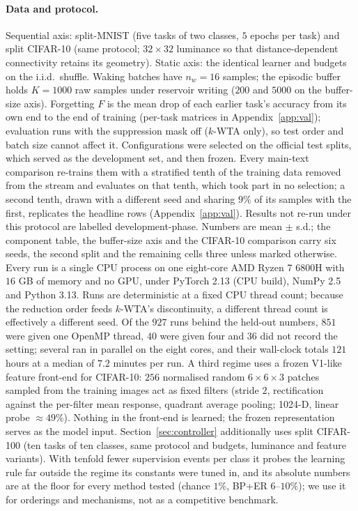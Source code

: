 \documentclass{article}
\newcommand{\kwta}{$k$-WTA}
\begin{document}
\paragraph{Data and protocol.}
Sequential axis: split-MNIST (five tasks of two classes, $5$ epochs per task) and split CIFAR-10
(same protocol; $32{\times}32$ luminance so that distance-dependent connectivity retains its
geometry). Static axis: the identical learner and budgets on the i.i.d.\ shuffle. Waking batches
have $n_w=16$ samples; the episodic buffer holds $K{=}1000$ raw samples under reservoir
writing ($200$ and $5000$ on the buffer-size axis). Forgetting $F$ is the mean drop of each
earlier task's accuracy from its own end to
the end of training (per-task matrices in Appendix~\ref{app:val}); evaluation runs with the
suppression mask off (\kwta{} only), so test order and batch size cannot affect it.
Configurations were selected on the official test splits, which served as the development
set, and then frozen. Every main-text comparison re-trains them with a stratified tenth of
the training data removed from the stream and evaluates on that tenth, which took part in no
selection; a second tenth, drawn with a different seed and sharing $9\%$ of its samples with
the first, replicates the headline rows (Appendix~\ref{app:val}). Results not re-run under
this protocol are labelled development-phase. Numbers are mean $\pm$ s.d.; the component
table, the buffer-size axis and the CIFAR-10 comparison carry six seeds, the second split
and the remaining cells three unless marked otherwise.
Every run is a single CPU process on one eight-core AMD Ryzen 7 6800H with $16$ GB of
memory and no GPU, under PyTorch 2.13 (CPU build), NumPy 2.5 and Python 3.13. Runs are
deterministic at a fixed CPU thread count; because the reduction order feeds \kwta's
discontinuity, a different thread count is effectively a different seed. Of the $927$ runs
behind the held-out numbers, $851$ were given one OpenMP thread, $40$ were given four and
$36$ did not record the setting; several ran in parallel on the eight cores, and their
wall-clock totals $121$ hours at a median of $7.2$ minutes per run.
A third regime uses a frozen V1-like feature front-end for CIFAR-10: $256$ normalised random
$6{\times}6{\times}3$ patches sampled from the training images act as fixed filters (stride $2$,
rectification against the per-filter mean response, quadrant average pooling; 1024-D, linear
probe $\approx49\%$). Nothing in the front-end is learned; the frozen representation serves as
the model input.
Section~\ref{sec:controller} additionally uses split CIFAR-100 (ten tasks of ten classes,
same protocol and budgets, luminance and feature variants). With tenfold fewer supervision
events per class it probes the learning rule far outside the regime its constants were tuned
in, and its absolute numbers are at the floor for every method tested (chance $1\%$, BP+ER
$6$--$10\%$); we use it for orderings and mechanisms, not as a competitive benchmark.
\end{document}
